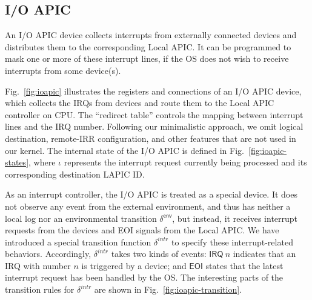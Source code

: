 \subsection{I/O APIC}

An I/O APIC device collects interrupts from externally connected devices and
distributes them to the corresponding Local APIC. It can be programmed to mask
one or more of these interrupt lines, if the OS does not wish to receive
interrupts from some device(s).

Fig.~\ref{fig:ioapic} illustrates the registers and connections of an I/O APIC
device, which collects the IRQs from devices and route them to the Local APIC
controller on CPU. The ``redirect table'' controls the mapping between interrupt
lines and the IRQ number. Following our minimalistic approach, we omit logical
destination, remote-IRR configuration, and other features that are not used in
our kernel. The internal state of the I/O APIC is defined in
Fig.~\ref{fig:ioapic-states}, where $\iota$ represents the interrupt request
currently being processed and its corresponding destination LAPIC ID.

As an interrupt controller, the I/O APIC is treated as a special device. It does
not observe any event from the external environment, and thus has neither a
local log nor an environmental transition $\delta^{\textsf{env}}$, but instead,
it receives interrupt requests from the devices and EOI signals from the Local
APIC. We have introduced a special transition function $\delta^{intr}$ to
specify these interrupt-related behaviors.  Accordingly, $\delta^{intr}$ takes
two kinds of events: $\textsf{IRQ} ~ n$ indicates that an IRQ with number $n$ is
triggered by a device; and $\textsf{EOI}$ states that the latest interrupt
request has been handled by the OS.  The interesting parts of the transition
rules for $\delta^{intr}$ are shown in Fig.~\ref{fig:ioapic-transition}.


